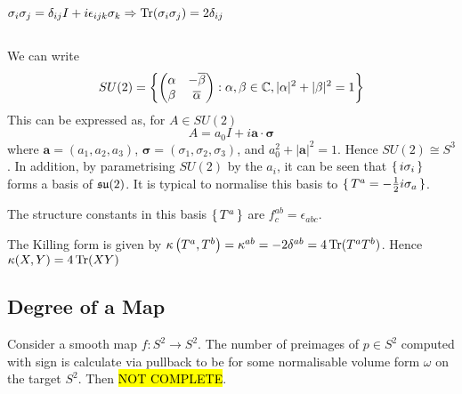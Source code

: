 \documentclass{article}
\begin{document}
\begin{fact}$\sigma_i \sigma_j = \delta_{ij}I +i\epsilon_{ijk}\sigma_k \Rightarrow \operatorname{Tr}(\sigma_i \sigma_j) = 2\delta_{ij}$
\end{fact}

\subsection{}
We can write 
\[
SU(2)=\left\{     \begin{pmatrix} \alpha & -\overline{\beta} \\ \beta & \overline{\alpha} \end{pmatrix}  : \alpha,\beta\in\mathbb{C} , |\alpha|^2+|\beta|^2=1    \right\}
\]
This can be expressed as, for $A\in SU(2)$
\[
A=a_0 I +i\bm{a}\cdot\bm{\sigma}
\]
where $\bm{a}=(a_1, a_2, a_3)$, $\bm{\sigma}=(\sigma_1, \sigma_2, \sigma_3)$, and $a_0^2+|\bm{a}|^2=1$. Hence $SU(2)\cong S^3$. In addition, by parametrising $SU(2)$ by the $a_i$, it can be seen that $\set{  i\sigma_i }$ forms a basis of $\mathfrak{su}(2)$. It is typical to normalise this basis to $\set{  T^a=-\frac{1}{2} i\sigma_a  }$. 

\begin{lemma}
	The structure constants in this basis $\set{  T^a  }$ are $f^{ab}_c=\epsilon_{abc}$.
\end{lemma}

\begin{corollary}
	The Killing form is given by $\kappa\left( T^a,T^b \right) = \kappa^{ab} = -2\delta^{ab} = 4\operatorname{Tr}(T^aT^b)$. Hence $\kappa(X,Y) = 4\operatorname{Tr}(XY)$
\end{corollary}


\subsection{Degree of a Map}
Consider a smooth map $f:S^2 \to S^2$. The number of preimages of $p \in S^2$ computed with sign is calculate via pullback to be 
for some normalisable volume form $\omega$ on the target $S^2$. Then \hl{NOT COMPLETE}.
\end{document}
